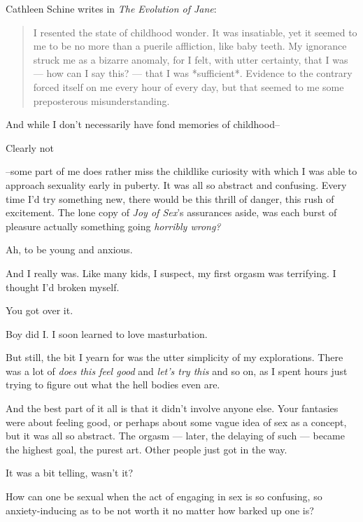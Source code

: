 \noindent Cathleen Schine writes in \emph{The Evolution of Jane}:

\begin{quotation}
  I resented the state of childhood wonder.  It was insatiable, yet it seemed to me to be no more than a puerile affliction, like baby teeth.  My ignorance struck me as a bizarre anomaly, for I felt, with utter certainty, that I was --- how can I say this? --- that I was *sufficient*.  Evidence to the contrary forced itself on me every hour of every day, but that seemed to me some preposterous misunderstanding.
\end{quotation}
And while I don't necessarily have fond memories of childhood--

\begin{ally}
Clearly not
\end{ally}
--some part of me does rather miss the childlike curiosity with which I was able to approach sexuality early in puberty. It was all so abstract and confusing. Every time I'd try something new, there would be this thrill of danger, this rush of excitement. The lone copy of \emph{Joy of Sex}'s assurances aside, was each burst of pleasure actually something going \emph{horribly wrong?}

\begin{ally}
Ah, to be young and anxious.
\end{ally}
And I really was. Like many kids, I suspect, my first orgasm was terrifying. I thought I'd broken myself.

\begin{ally}
You got over it.
\end{ally}
Boy did I. I soon learned to love masturbation.

But still, the bit I yearn for was the utter simplicity of my explorations. There was a lot of \emph{does this feel good} and \emph{let's try this} and so on, as I spent hours just trying to figure out what the hell bodies even are.

\begin{ally}
And the best part of it all is that it didn't involve anyone else. Your fantasies were about feeling good, or perhaps about some vague idea of sex as a concept, but it was all so abstract. The orgasm --- later, the delaying of such --- became the highest goal, the purest art. Other people just got in the way.
\end{ally}
It was a bit telling, wasn't it?
\newpage

How can one be sexual when the act of engaging in sex is so confusing, so anxiety-inducing as to be not worth it no matter how barked up one is?

